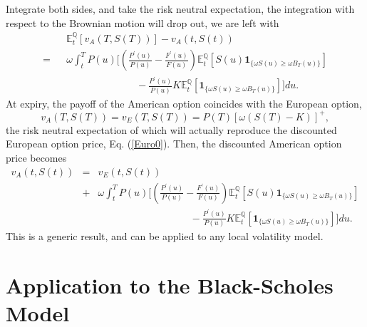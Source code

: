 \documentclass[12pt]{article}
\begin{document}
    Integrate both sides, and take the risk neutral expectation, the integration with respect to the Brownian motion
    will drop out, we are left with
    \begin{eqnarray}
      &&{\mathbb E}_t^{\mathbb Q}\left[v_A(T,S(T))\right]-v_A(t,S(t)) \nonumber\\
      = &&\omega\int_t^T P(u)\Bigg[\left(\frac{P^{\prime}(u)}{P(u)}-\frac{F^{\prime}(u)}{F(u)}\right)
                          {\mathbb E}_t^{\mathbb Q}\left[S(u)\mathbf{1}_{\{\omega S(u)\geq\omega B_T(u)\}}\right]\nonumber\\
        &&\quad\quad\quad\quad\quad\quad\quad- \frac{P^{\prime}(u)}{P(u)} K
                          {\mathbb E}_t^{\mathbb Q}\left[\mathbf{1}_{\{\omega S(u)\geq\omega B_T(u)\}}\right] \Bigg]du.
    \end{eqnarray}
    At expiry, the payoff of the American option coincides with the European option,
    \begin{equation}
      v_A(T,S(T)) = v_E(T,S(T))=P(T)\left[\omega\left(S(T)-K\right)\right]^+,
    \end{equation}
    the risk neutral expectation of which will actually reproduce the discounted European option price, Eq. (\ref{Euro0}).
    Then, the discounted American option price becomes
    \begin{eqnarray}
      \label{EEP0}
      v_A(t,S(t)) &=& v_E(t,S(t))\nonumber\\
      &+&\omega\int_t^T P(u)\Bigg[\left(\frac{P^{\prime}(u)}{P(u)}-\frac{F^{\prime}(u)}{F(u)}\right)
      {\mathbb E}_t^{\mathbb Q}\left[S(u)\mathbf{1}_{\{\omega S(u)\geq\omega B_T(u)\}}\right]\nonumber\\
      &&\quad\quad\quad\quad\quad\quad\quad\quad\quad\ - \frac{P^{\prime}(u)}{P(u)} K
      {\mathbb E}_t^{\mathbb Q}\left[\mathbf{1}_{\{\omega S(u)\geq\omega B_T(u)\}}\right] \Bigg]du.
    \end{eqnarray}
    This is a generic result, and can be applied to any local volatility model.

  \section{Application to the Black-Scholes Model}
\end{document}
